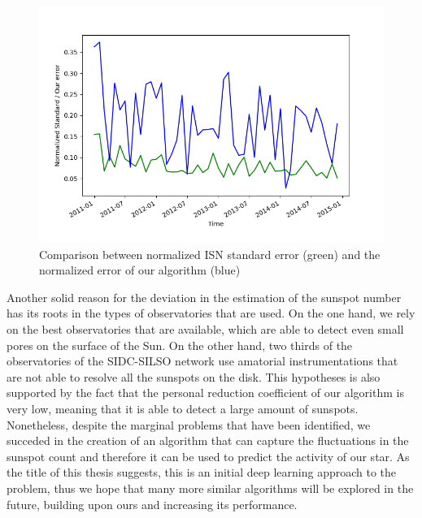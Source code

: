 \bigbreak
\begin{figure}[t!]
  \centering
  \captionsetup{justification=centering}
  \includegraphics[width=\textwidth]{./pictures/error-norm}
  \caption{Comparison between normalized ISN standard error (green) and the normalized error of our algorithm (blue)}
  \label{fig:error-norm}
\end{figure}
\noindent Another solid reason for the deviation in the estimation of the sunspot number has its roots in the types of observatories that are used. On the one hand, we rely on the best observatories that are available, which are able to detect even small pores on the surface of the Sun. On the other hand, two thirds of the observatories of the SIDC-SILSO network use amatorial instrumentations that are not able to resolve all the sunspots on the disk. This hypotheses is also supported by the fact that the personal reduction coefficient of our algorithm is very low, meaning that it is able to detect a large amount of sunspots.
\bigbreak
\noindent Nonetheless, despite the marginal problems that have been identified, we succeded in the creation of an algorithm that can capture the fluctuations in the sunspot count and therefore it can be used to predict the activity of our star. As the title of this thesis suggests, this is an initial deep learning approach to the problem, thus we hope that many more similar algorithms will be explored in the future, building upon ours and increasing its performance.
